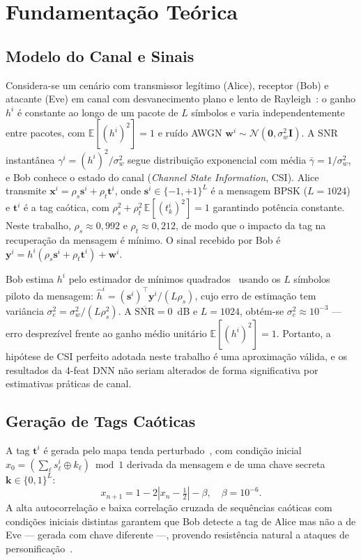 \documentclass{sbrt}
\begin{document}
\section{Fundamentação Teórica}

\subsection{Modelo do Canal e Sinais}

Considera-se um cenário com transmissor legítimo (Alice), receptor (Bob) e atacante (Eve) em canal com desvanecimento plano e lento de Rayleigh~\cite{ref_joao}: o ganho $h^i$ é constante ao longo de um pacote de $L$ símbolos e varia independentemente entre pacotes, com $\mathbb{E}[(h^i)^2] = 1$ e ruído AWGN $\mathbf{w}^i \sim \mathcal{N}(\mathbf{0}, \sigma_w^2\mathbf{I})$. A SNR instantânea $\gamma^i = (h^i)^2/\sigma_w^2$ segue distribuição exponencial com média $\bar{\gamma} = 1/\sigma_w^2$, e Bob conhece o estado do canal (\textit{Channel State Information}, CSI). Alice transmite $\mathbf{x}^i = \rho_s \mathbf{s}^i + \rho_t \mathbf{t}^i$, onde $\mathbf{s}^i \in \{-1,+1\}^L$ é a mensagem BPSK ($L = 1024$) e $\mathbf{t}^i$ é a tag caótica, com $\rho_s^2 + \rho_t^2\,\mathbb{E}[(t_k^i)^2] = 1$ garantindo potência constante. Neste trabalho, $\rho_s \approx 0{,}992$ e $\rho_t \approx 0{,}212$, de modo que o impacto da tag na recuperação da mensagem é mínimo. O sinal recebido por Bob é $\mathbf{y}^i = h^i(\rho_s \mathbf{s}^i + \rho_t \mathbf{t}^i) + \mathbf{w}^i$.

Bob estima $h^i$ pelo estimador de mínimos quadrados~\cite{ref_kay} usando os $L$ símbolos piloto da mensagem: $\hat{h}^i = (\mathbf{s}^i)^\top \mathbf{y}^i / (L \rho_s)$, cujo erro de estimação tem variância $\sigma_e^2 = \sigma_w^2 / (L \rho_s^2)$. A $\overline{\text{SNR}} = 0$~dB e $L = 1024$, obtém-se $\sigma_e^2 \approx 10^{-3}$ — erro desprezível frente ao ganho médio unitário $\mathbb{E}[(h^i)^2] = 1$. Portanto, a hipótese de CSI perfeito adotada neste trabalho é uma aproximação válida, e os resultados da 4-feat DNN não seriam alterados de forma significativa por estimativas práticas de canal.

\subsection{Geração de Tags Caóticas}

A tag $\mathbf{t}^i$ é gerada pelo mapa tenda perturbado~\cite{ref_joao}, com condição inicial $x_0 = (\sum_\ell s^i_\ell \oplus k_\ell) \bmod 1$ derivada da mensagem e de uma chave secreta $\mathbf{k} \in \{0,1\}^L$:
\begin{equation}\label{eq:tentmap}
    x_{n+1} = 1 - 2\left|x_n - \tfrac{1}{2}\right| - \beta,\quad \beta = 10^{-6}.
\end{equation}
A alta autocorrelação e baixa correlação cruzada de sequências caóticas com condições iniciais distintas garantem que Bob detecte a tag de Alice mas não a de Eve — gerada com chave diferente —, provendo resistência natural a ataques de personificação~\cite{ref_joao}.
\end{document}
